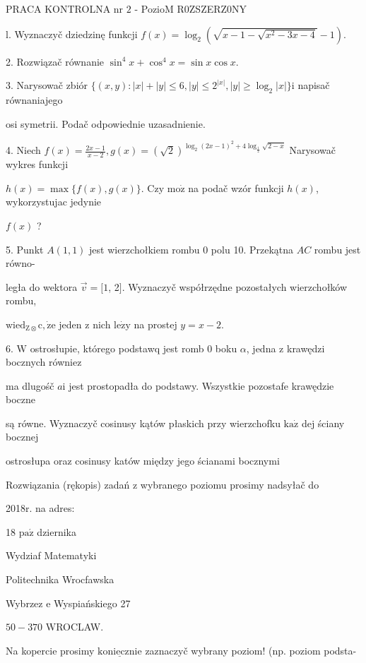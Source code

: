 \documentclass[a4paper,12pt]{article}
\begin{document}
PRACA KONTROLNA nr $2$ - PozioM R0ZSZERZ0NY

l. Wyznaczyč dziedzinę funkcji $f(x)=\log_{2}(\sqrt{x-1-\sqrt{x^{2}-3x-4}}-1).$

2. Rozwiązač równanie $\sin^{4}x+\cos^{4}x=\sin x\cos x.$

3. Narysowač zbiór $\{(x,y):|x|+|y|\leq 6,|y|\leq 2^{|x|},|y|\geq\log_{2}|x|\}\mathrm{i}$ napisač równaniajego

osi symetrii. Podač odpowiednie uzasadnienie.

4. Niech $f(x) = \displaystyle \frac{2x-1}{x-2}, g(x) = (\sqrt{2})^{\log_{2}(2x-1)^{2}+4\log_{\frac{1}{2}}\sqrt{2-x}}$ Narysowač wykres funkcji

$h(x) = \displaystyle \max\{f(x),g(x)\}$. Czy $\mathrm{m}\mathrm{o}\dot{\mathrm{z}}$ na podač wzór funkcji $h(x)$, wykorzystujac jedynie

$f(x)$ ?

5. Punkt $A(1,1)$ jest wierzchołkiem rombu $0$ polu 10. Przekątna $AC$ rombu jest równo-

legła do wektora $\vec{v}=[1$, 2$]$. Wyznaczyč współrzędne pozostałych wierzchołków rombu,

$\mathrm{w}\mathrm{i}\mathrm{e}\mathrm{d}_{\mathrm{Z}\otimes}\mathrm{c}, \dot{\mathrm{z}}\mathrm{e}$ jeden $\mathrm{z}$ nich $\mathrm{l}\mathrm{e}\dot{\mathrm{z}}\mathrm{y}$ na prostej $y=x-2.$

6. $\mathrm{W}$ ostrosłupie, którego podstawq jest romb $0$ boku $\alpha$, jedna $\mathrm{z}$ krawędzi bocznych równiez

ma dlugośč $a\mathrm{i}$ jest prostopadła do podstawy. Wszystkie pozostafe krawędzie boczne

są równe. Wyznaczyč cosinusy kątów płaskich przy wierzchofku $\mathrm{k}\mathrm{a}\dot{\mathrm{z}}$ dej ściany bocznej

ostrosłupa oraz cosinusy katów między jego ścianami bocznymi

Rozwiązania (rękopis) zadań z wybranego poziomu prosimy nadsyłač do

2018r. na adres:

18 $\mathrm{p}\mathrm{a}\acute{\mathrm{z}}$ dziernika

Wydziaf Matematyki

Politechnika Wrocfawska

Wybrzez $\mathrm{e}$ Wyspiańskiego 27

$50-370$ WROCLAW.

Na kopercie prosimy $\underline{\mathrm{k}\mathrm{o}\mathrm{n}\mathrm{i}\mathrm{e}\mathrm{c}\mathrm{z}\mathrm{n}\mathrm{i}\mathrm{e}}$ zaznaczyč wybrany poziom! (np. poziom podsta-
\end{document}
